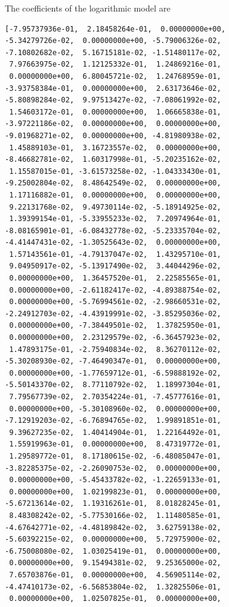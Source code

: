 \documentclass{article}
\begin{document}
The coefficients of the logarithmic model are\\
\begin{verbatim}
[-7.95737936e-01,  2.18458264e-01,  0.00000000e+00,
-5.34279726e-02,  0.00000000e+00, -5.79006326e-02,
-7.10802682e-02,  5.16715181e-02, -1.51480117e-02,
 7.97663975e-02,  1.12125332e-01,  1.24869216e-01,
 0.00000000e+00,  6.80045721e-02,  1.24768959e-01,
-3.93758384e-01,  0.00000000e+00,  2.63173646e-02,
-5.80898284e-02,  9.97513427e-02, -7.08061992e-02,
 1.54603172e-01,  0.00000000e+00,  1.06665838e-01,
-3.97221186e-02,  0.00000000e+00,  0.00000000e+00,
-9.01968271e-02,  0.00000000e+00, -4.81980938e-02,
 1.45889103e-01,  3.16723557e-02,  0.00000000e+00,
-8.46682781e-02,  1.60317998e-01, -5.20235162e-02,
 1.15587015e-01, -3.61573258e-02, -1.04333430e-01,
-9.25002804e-02,  8.48642549e-02,  0.00000000e+00,
 1.17116882e-01,  0.00000000e+00,  0.00000000e+00,
 9.22131768e-02,  9.49730114e-02, -5.18914925e-02,
 1.39399154e-01, -5.33955233e-02,  7.20974964e-01,
-8.08165901e-01, -6.08432778e-02, -5.23335704e-02,
-4.41447431e-02, -1.30525643e-02,  0.00000000e+00,
 1.57143561e-01, -4.79137047e-02,  1.43295710e-01,
 9.04950917e-02, -5.13917490e-02,  3.44044296e-02,
 0.00000000e+00,  1.36457520e-01,  2.22585565e-01,
 0.00000000e+00, -2.61182417e-02, -4.89388754e-02,
 0.00000000e+00, -5.76994561e-02, -2.98660531e-02,
-2.24912703e-02, -4.43919991e-02, -3.85295036e-02,
 0.00000000e+00, -7.38449501e-02,  1.37825950e-01,
 0.00000000e+00,  2.23129579e-02, -6.36457923e-02,
 1.47893175e-01, -2.75940834e-02,  8.36270112e-02,
-5.30208930e-02, -7.46490347e-01,  0.00000000e+00,
 0.00000000e+00, -1.77659712e-01, -6.59888192e-02,
-5.50143370e-02,  8.77110792e-02,  1.18997304e-01,
 7.79567739e-02,  2.70354224e-01, -7.45777616e-01,
 0.00000000e+00, -5.30108960e-02,  0.00000000e+00,
-7.12919203e-02, -6.76894765e-02,  1.99891851e-01,
 9.39627235e-02,  1.40414904e-01,  1.22164492e-01,
 1.55919963e-01,  0.00000000e+00,  8.47319772e-01,
 1.29589772e-01,  8.17180615e-02, -6.48085047e-01,
-3.82285375e-02, -2.26090753e-02,  0.00000000e+00,
 0.00000000e+00, -5.45433782e-02, -1.22659133e-01,
 0.00000000e+00,  1.02199823e-01,  0.00000000e+00,
-5.67213614e-02,  1.19316261e-01,  8.01828245e-01,
 8.48308242e-02, -5.77530166e-02,  1.11480585e-01,
-4.67642771e-02, -4.48189842e-02,  3.62759138e-02,
-5.60392215e-02,  0.00000000e+00,  5.72975900e-02,
-6.75008080e-02,  1.03025419e-01,  0.00000000e+00,
 0.00000000e+00,  9.15494381e-02,  9.25365000e-02,
 7.65703876e-01,  0.00000000e+00,  4.56905114e-02,
-4.47410173e-02, -6.56853804e-02,  1.32825506e-01,
 0.00000000e+00,  1.02507825e-01,  0.00000000e+00,

\end{verbatim}
\end{document}
